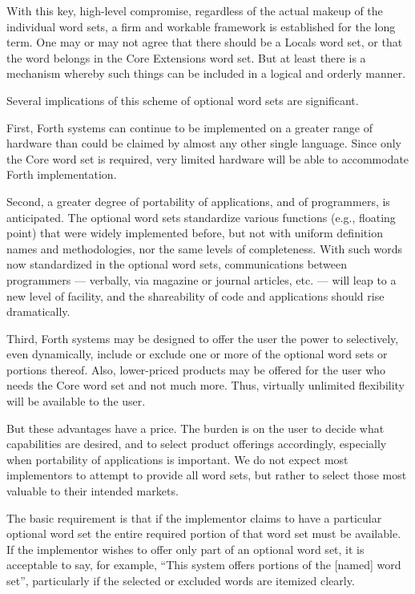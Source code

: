 With this key, high-level compromise, regardless of the actual
makeup of the individual word sets, a firm and workable framework
is established for the long term. One may or may not agree that
there should be a Locals word set, or that the word 
belongs in the Core Extensions word set. But at least there is a
mechanism whereby such things can be included in a logical and
orderly manner.

Several implications of this scheme of optional word sets are
significant.

First,  Forth systems can continue to be implemented on a greater
range of hardware than could be claimed by almost any other single
language. Since only the Core word set is required, very limited
hardware will be able to accommodate  Forth implementation.

Second, a greater degree of portability of applications, and of
programmers, is anticipated. The optional word sets standardize
various functions (e.g., floating point) that were widely implemented
before, but not with uniform definition names and methodologies, nor
the same levels of completeness. With such words now standardized in
the optional word sets, communications between programmers ---
verbally, via magazine or journal articles, etc. --- will leap to a
new level of facility, and the shareability of code and applications
should rise dramatically.

Third,  Forth systems may be designed to offer the user the power
to selectively, even dynamically, include or exclude one or more of
the optional word sets or portions thereof. Also, lower-priced
products may be offered for the user who needs the Core word set
and not much more. Thus, virtually unlimited flexibility will be
available to the user.

But these advantages have a price. The burden is on the user to
decide what capabilities are desired, and to select product
offerings accordingly, especially when portability of applications
is important. We do not expect most implementors to attempt to
provide all word sets, but rather to select those most valuable to
their intended markets.

The basic requirement is that if the implementor claims to have a
particular optional word set the entire required portion of that
word set must be available. If the implementor wishes to offer only
part of an optional word set, it is acceptable to say, for example,
``This system offers portions of the [named] word set'', particularly
if the selected or excluded words are itemized clearly.

